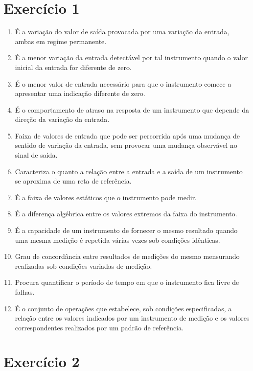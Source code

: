 \section*{Exercício 1}

\begin{enumerate}
    \item[\textbf{a)}] É a variação do valor de saída provocada por uma variação da entrada, ambas em regime permanente.
    \item[\textbf{b)}] É a menor variação da entrada detectável por tal instrumento quando o valor inicial da entrada for diferente de zero.
    \item[\textbf{c)}] É o menor valor de entrada necessário para que o instrumento comece a apresentar uma indicação diferente de zero.
    \item[\textbf{d)}] É o comportamento de atraso na resposta de um instrumento que depende da direção da variação da entrada.
    \item[\textbf{e)}] Faixa de valores de entrada que pode ser percorrida após uma mudança de sentido de variação da entrada, sem provocar uma mudança observável no sinal de saída.
    \item[\textbf{f)}] Caracteriza o quanto a relação entre a entrada e a saída de um instrumento se aproxima de uma reta de referência.
    \item[\textbf{g)}] É a faixa de valores estáticos que o instrumento pode medir.
    \item[\textbf{h)}] É a diferença algébrica entre os valores extremos da faixa do instrumento.
    \item[\textbf{i)}] É a capacidade de um instrumento de fornecer o mesmo resultado quando uma mesma medição é repetida várias vezes sob condições idênticas.
    \item[\textbf{j)}] Grau de concordância entre resultados de medições do mesmo mensurando realizadas sob condições variadas de medição.
    \item[\textbf{k)}] Procura quantificar o período de tempo em que o instrumento fica livre de falhas.
    \item[\textbf{l)}] É o conjunto de operações que estabelece, sob condições especificadas, a relação entre os valores indicados por um instrumento de medição e os valores correspondentes realizados por um padrão de referência.
\end{enumerate}

\section*{Exercício 2}

